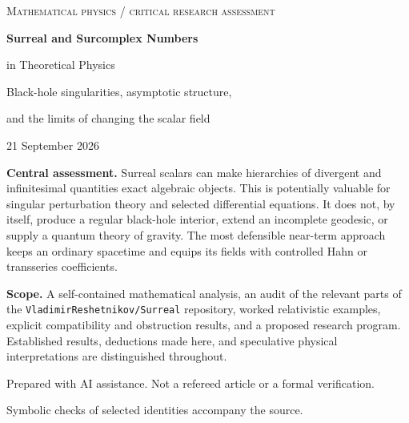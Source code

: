 \documentclass[11pt,a4paper]{article}
\numberwithin{equation}{section}
\theoremstyle{definition}
\theoremstyle{remark}
\begin{document}
\begin{titlepage}
\centering
\vspace*{16mm}
{\color{accent}\large\textsc{Mathematical physics / critical research assessment}\par}
\vspace{13mm}
{\color{ink}\Huge\bfseries Surreal and Surcomplex Numbers\par}
\vspace{4mm}
{\color{ink}\LARGE in Theoretical Physics\par}
\vspace{10mm}
{\Large Black-hole singularities, asymptotic structure,\par
and the limits of changing the scalar field\par}
\vspace{13mm}
{\large 21 September 2026\par}
\vspace{13mm}
\begin{minipage}{0.89\textwidth}
\normalsize
\textbf{Central assessment.} Surreal scalars can make hierarchies of divergent and
infinitesimal quantities exact algebraic objects. This is potentially valuable for
singular perturbation theory and selected differential equations. It does not,
by itself, produce a regular black-hole interior, extend an incomplete geodesic,
or supply a quantum theory of gravity. The most defensible near-term approach
keeps an ordinary spacetime and equips its fields with controlled Hahn or
transseries coefficients.

\medskip
\textbf{Scope.} A self-contained mathematical analysis, an audit of the relevant
parts of the \texttt{VladimirReshetnikov/Surreal} repository, worked relativistic
examples, explicit compatibility and obstruction results, and a proposed research
program. Established results, deductions made here, and speculative physical
interpretations are distinguished throughout.
\end{minipage}
\vfill
{\small Prepared with AI assistance. Not a refereed article or a formal verification.\par
Symbolic checks of selected identities accompany the source.\par}
\end{titlepage}
\end{document}

